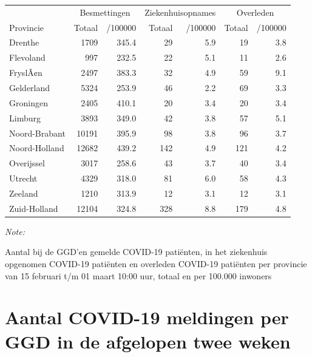 \documentclass[
  english,
  man,floatsintext]{apa6}
\begin{document}
\begin{table}
\centering
\begin{threeparttable}
\begin{tabular}{lrrrrrr}
\toprule
\multicolumn{1}{c}{ } & \multicolumn{2}{c}{Besmettingen} & \multicolumn{2}{c}{Ziekenhuisopnames} & \multicolumn{2}{c}{Overleden} \\
\cmidrule(l{3pt}r{3pt}){2-3} \cmidrule(l{3pt}r{3pt}){4-5} \cmidrule(l{3pt}r{3pt}){6-7}
Provincie & Totaal & /100000 & Totaal & /100000 & Totaal & /100000\\
\midrule
Drenthe & 1709 & 345.4 & 29 & 5.9 & 19 & 3.8\\
Flevoland & 997 & 232.5 & 22 & 5.1 & 11 & 2.6\\
FryslÃ¢n & 2497 & 383.3 & 32 & 4.9 & 59 & 9.1\\
Gelderland & 5324 & 253.9 & 46 & 2.2 & 69 & 3.3\\
Groningen & 2405 & 410.1 & 20 & 3.4 & 20 & 3.4\\
Limburg & 3893 & 349.0 & 42 & 3.8 & 57 & 5.1\\
Noord-Brabant & 10191 & 395.9 & 98 & 3.8 & 96 & 3.7\\
Noord-Holland & 12682 & 439.2 & 142 & 4.9 & 121 & 4.2\\
Overijssel & 3017 & 258.6 & 43 & 3.7 & 40 & 3.4\\
Utrecht & 4329 & 318.0 & 81 & 6.0 & 58 & 4.3\\
Zeeland & 1210 & 313.9 & 12 & 3.1 & 12 & 3.1\\
Zuid-Holland & 12104 & 324.8 & 328 & 8.8 & 179 & 4.8\\
\bottomrule
\end{tabular}
\begin{tablenotes}
\item \textit{Note: } 
\item Aantal bij de GGD’en gemelde COVID-19 patiënten, in het ziekenhuis opgenomen COVID-19 patiënten en overleden COVID-19 patiënten per provincie van 15 februari t/m 01 maart 10:00 uur, totaal en per 100.000 inwoners
\end{tablenotes}
\end{threeparttable}
\end{table}

\newpage

\hypertarget{aantal-covid-19-meldingen-per-ggd-in-de-afgelopen-twee-weken}{%
\section{Aantal COVID-19 meldingen per GGD in de afgelopen twee weken}\label{aantal-covid-19-meldingen-per-ggd-in-de-afgelopen-twee-weken}}
\end{document}
